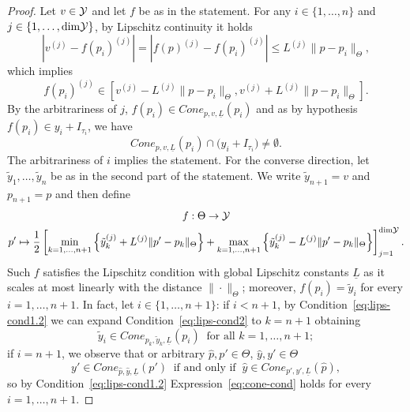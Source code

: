 \begin{proof}
    Let $v\in \mathcal Y$ and let $f$ be as in the statement.
    For any $i\in \{1, \dots, n\}$ and $j \in \{1, \dots, \text{dim}\mathcal Y\}$, by Lipschitz continuity it holds 
    \[
    | v^{(j)} - f(p_i)^{(j)} | = | f(p)^{(j)} - f(p_i)^{(j)} | \leq L^{(j)} \|p-p_i\|_\Theta, 
    \] 
    which implies \[
        f(p_i)^{(j)} \in \left[ v^{(j)} - L^{(j)} \|p-p_i\|_\Theta, v^{(j)} + L^{(j)} \|p-p_i\|_\Theta \right].
    \]
    By the arbitrariness of $j$, $f(p_i) \in Cone_{p,v,\underline L}(p_i) $ and as by hypothesis $f(p_i) \in y_i + I_{\tau_i}$, we have \[
    Cone_{p,v,\underline L}(p_i) \cap  \big ( y_i + I_{\tau_i} \big ) \neq \emptyset.
    \] 
    The arbitrariness of $i$ implies the statement. \newline
    For the converse direction, let $\tilde y_1, \dots, \tilde y_n$ be as in the second part of the statement.
    We write $\tilde y_{n+1} = v$ and $p_{n+1} = p$ and then define
    \begin{equation}\label{eq:lips-interp}
        \begin{gathered}
            f:\Theta \rightarrow \mathcal Y \\
            p' \mapsto \frac{1}{2} \left[\min_{k=1,\dots,n+1} \left\{ \tilde y_k^{(j)} + L^{(j)} \| p' - p_k \|_\Theta \right\}+ \max_{k=1,\dots,n+1} \left\{ \tilde y_k^{(j)} - L^{(j)} \| p' - p_k \|_\Theta \right\} \right]_{j=1}^{\text{dim} \mathcal Y}.
        \end{gathered}
    \end{equation}
    Such $f$ satisfies the Lipschitz condition with global Lipschitz constants $\underline L$ as it scales at most linearly with the distance $\| \cdot \|_\Theta$; moreover, $f(p_i) = \tilde y_i$ for every $i = 1, \dots, n+1$.
    In fact, let $i \in \{ 1, \dots, n+1\}$: if $i<n+1$, by Condition~\eqref{eq:lips-cond1.2} we can expand Condition~\eqref{eq:lips-cond2} to $k=n+1$ obtaining
    \begin{equation}\label{eq:cone-cond}
        \tilde y_i \in Cone_{p_k, \tilde y_k,\underline L}(p_i) \ \text{ for all } k = 1, \dots, n+1;
    \end{equation}
    if $i= n+1$, we observe that or arbitrary $\hat p,p' \in \Theta$, $\hat y,y'\in \Theta$ \[
        y' \in Cone_{\hat p, \hat y, \underline L}(p') \ \text{ if and only if } \ \hat y \in Cone_{p', y', \underline L}(\hat p),
    \]
    so by Condition~\eqref{eq:lips-cond1.2} Expression~\eqref{eq:cone-cond} holds for every $i=1, \dots, n+1$. \newline

\end{proof}
